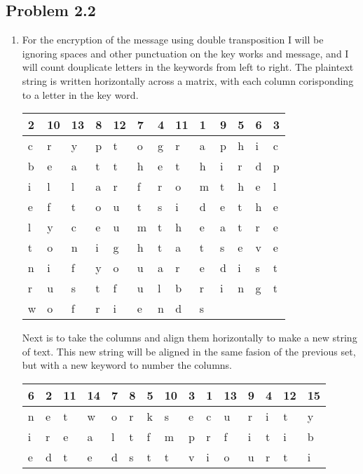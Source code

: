 \documentclass[12pt]{article}
\begin{document}
\subsection{Problem  2.2 \cite[p.~68]{stallings}}
\begin{enumerate}[label=(\alph*)]
\item For the encryption of the message using double transposition I will be ignoring spaces and other punctuation on the key works and message, and I will count douplicate letters in the keywords from left to right. The plaintext string is written horizontally across a matrix, with each column corisponding to a letter in the key word.
\newline
\begin{tabular}{ l l l l l l l l l l l l l }
2 & 10 & 13 & 8 & 12 & 7 & 4 & 11 & 1 & 9 & 5 & 6 & 3\\
\hline
c & r & y & p & t & o & g & r & a & p & h & i & c\\
\hline
b & e & a & t & t & h & e & t & h & i & r & d & p\\
i & l & l & a & r & f & r & o & m & t & h & e & l\\
e & f & t & o & u & t & s & i & d & e & t & h & e\\
l & y & c & e & u & m & t & h & e & a & t & r & e\\
t & o & n & i & g & h & t & a & t & s & e & v & e\\
n & i & f & y & o & u & a & r & e & d & i & s & t\\
r & u & s & t & f & u & l & b & r & i & n & g & t\\
w & o & f & r & i & e & n & d & s\\
\end{tabular}
\newline
\newline
 Next is to take the columns and align them horizontally to make a new string of text. This new string will be aligned in the same fasion of the previous set, but with a new keyword to number the columns. 
\newline
\newline
\begin{tabular}{ l l l l l l l l l l l l l l l}
6 & 2 & 11 & 14 & 7 & 8 & 5 & 10 & 3 & 	1 & 13 & 9 & 4 & 12 & 15\\
\hline
n & e & t & w & o & r & k & s & e & c & u & r & i & t & y\\
\hline
i & r & e & a & l & t & f & m & p & r & f & i & t & i & b\\
e & d & t & e & d & s & t & t & v & i & o & u & r & t & i\\

\end{tabular}
\end{enumerate}
\end{document}
